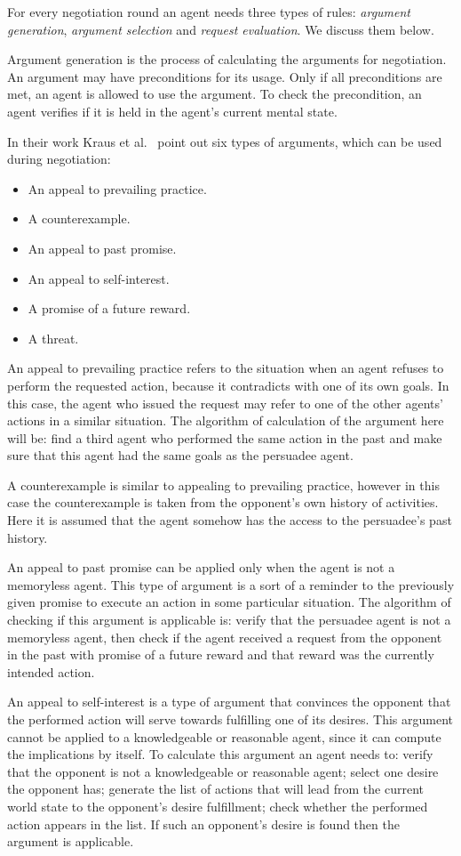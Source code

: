 For every negotiation round an agent needs three types of rules: \emph{argument generation}, \emph{argument selection} and \emph{request evaluation}.
We discuss them below.

Argument generation is the process of calculating the arguments for negotiation.
An argument may have preconditions for its usage.
Only if all preconditions are met, an agent is allowed to use the argument.
To check the precondition, an agent verifies if it is held in the agent's current mental state.

In their work Kraus et al.~\cite{Kraus_98} point out six types of arguments, which can be used during negotiation:
\begin{itemize}
  \item An appeal to prevailing practice.
  \item A counterexample.
  \item An appeal to past promise.
  \item An appeal to self-interest.
  \item A promise of a future reward.
  \item A threat.
\end{itemize}

An appeal to prevailing practice refers to the situation when an agent refuses to perform the requested action, because it contradicts with one of its own goals.
In this case, the agent who issued the request may refer to one of the other agents' actions in a similar situation.
The algorithm of calculation of the argument here will be: find a third agent who performed the same action in the past and make sure that this agent had the same goals as the persuadee agent.

A counterexample is similar to appealing to prevailing practice, however in this case the counterexample is taken from the opponent's own history of activities.
Here it is assumed that the agent somehow has the access to the persuadee's past history.

An appeal to past promise can be applied only when the agent is not a memoryless agent.
This type of argument is a sort of a reminder to the previously given promise to execute an action in some particular situation.
The algorithm of checking if this argument is applicable is: verify that the persuadee agent is not a memoryless agent, then check if the agent received a request from the opponent in the past with promise of a future reward and that reward was the currently intended action.

An appeal to self-interest is a type of argument that convinces the opponent that the performed action will serve towards fulfilling one of its desires.
This argument cannot be applied to a knowledgeable or reasonable agent, since it can compute the implications by itself.
To calculate this argument an agent needs to: verify that the opponent is not a knowledgeable or reasonable agent; select one desire the opponent has; generate the list of actions that will lead from the current world state to the opponent's desire fulfillment; check whether the performed action appears in the list.
If such an opponent's desire is found then the argument is applicable.

